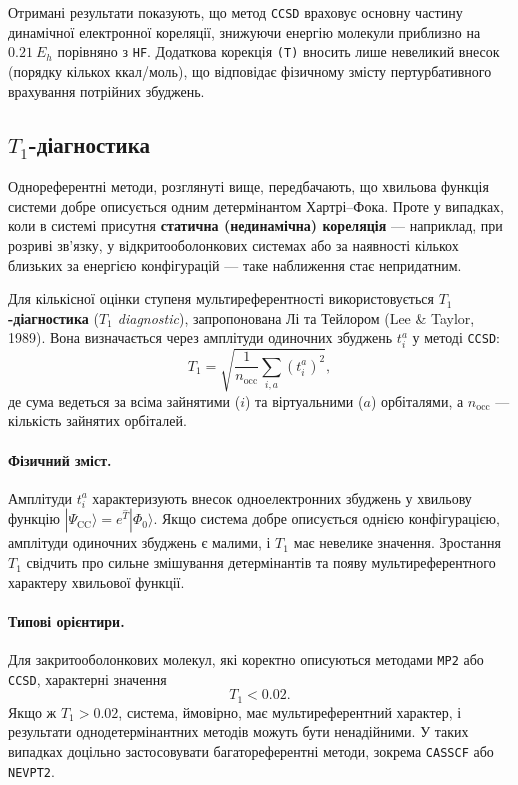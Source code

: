 Отримані результати показують, що метод \texttt{CCSD} враховує
основну частину динамічної електронної кореляції, знижуючи енергію
молекули  приблизно на \(0.21~E_h\) порівняно з \texttt{HF}.
Додаткова корекція \texttt{(T)} вносить лише невеликий внесок
(порядку кількох ккал/моль), що відповідає фізичному змісту
пертурбативного врахування потрійних збуджень.


\subsection{$T_1$-діагностика}

Однореферентні методи, розглянуті вище, передбачають,
що хвильова функція системи добре описується одним детермінантом
Хартрі–Фока. Проте у випадках, коли в системі присутня
\textbf{статична (нединамічна) кореляція} --- наприклад, при розриві
зв’язку, у відкритооболонкових системах або за наявності кількох
близьких за енергією конфігурацій --- таке наближення стає непридатним.

Для кількісної оцінки ступеня мультиреферентності
використовується \textbf{$T_1$-діагностика}
(\emph{$T_1$ diagnostic}), запропонована Лі та Тейлором (Lee \& Taylor, 1989).
Вона визначається через амплітуди одиночних збуджень \(t_i^a\)
у методі \texttt{CCSD}:
\begin{equation}
    T_1 = \sqrt{\frac{1}{n_\text{occ}} \sum_{i,a} (t_i^a)^2},
\end{equation}
де сума ведеться за всіма зайнятими (\(i\)) та віртуальними (\(a\))
орбіталями, а \(n_\text{occ}\) --- кількість зайнятих орбіталей.

\paragraph{Фізичний зміст.}
Амплітуди \(t_i^a\) характеризують внесок одноелектронних
збуджень у хвильову функцію
\(|\Psi_{\text{CC}}\rangle = e^{\hat{T}}|\Phi_0\rangle\).
Якщо система добре описується однією конфігурацією,
амплітуди одиночних збуджень є малими, і $T_1$ має невелике значення.
Зростання $T_1$ свідчить про сильне змішування детермінантів
та появу мультиреферентного характеру хвильової функції.

\paragraph{Типові орієнтири.}
Для закритооболонкових молекул, які коректно описуються
методами \texttt{MP2} або \texttt{CCSD}, характерні значення
\[
T_1 < 0.02.
\]
Якщо ж \(T_1 > 0.02\), система, ймовірно, має мультиреферентний характер,
і результати однодетермінантних методів можуть бути ненадійними.
У таких випадках доцільно застосовувати багатореферентні методи,
зокрема \texttt{CASSCF} або \texttt{NEVPT2}.

